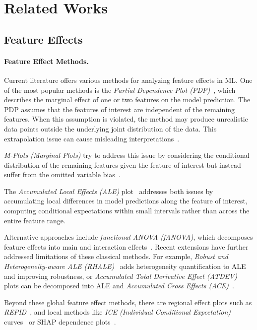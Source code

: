 \documentclass[runningheads]{llncs}
\begin{document}
\section{Related Works}\label{sec:related-works}

\subsection{Feature Effects}

\paragraph{Feature Effect Methods.}
Current literature offers various methods for analyzing feature effects in ML. %
One of the most popular methods is the \textit{Partial Dependence Plot
    (PDP)}~\cite{friedman_greedy_2001}, which describes the marginal effect of one
or two features on the model prediction. The PDP assumes that the features of
interest are independent of the remaining features. When this assumption is
violated, the method may produce unrealistic data points outside the underlying
joint distribution of the data. This extrapolation issue can cause misleading
interpretations~\cite{molnar_interpretable_2022,molnar_general_2022}.

\textit{M-Plots (Marginal Plots)} try to address this issue by considering the
conditional distribution of the remaining features given the feature of interest
but instead suffer from the omitted variable
bias~\cite{apley_visualizing_2020,friedman_greedy_2001}.

The \textit{Accumulated Local Effects (ALE)} plot~\cite{apley_visualizing_2020}
addresses both issues by accumulating local differences in model predictions
along the feature of interest, computing conditional expectations within small
intervals rather than across the entire feature range.

Alternative approaches include \textit{functional ANOVA (fANOVA)}, which
decomposes feature effects into main and interaction
effects~\cite{hooker_discovering_2004}. Recent extensions have further
addressed limitations of these classical methods. For example, \textit{Robust
    and Heterogeneity-aware ALE (RHALE)}~\cite{gkolemis_rhale_2023} adds
heterogeneity quantification to ALE and improving robustness, or
\textit{Accumulated Total Derivative Effect (ATDEV)} plots can be decomposed
into ALE and \textit{Accumulated Cross Effects (ACE)}~\cite{liu_model_2018}.

Beyond these global feature effect methods, there are regional effect plots
such as \textit{REPID}~\cite{herbinger_repid_2022}, and local methods like
\textit{ICE (Individual Conditional Expectation)}
curves~\cite{goldstein_peeking_2015} or SHAP dependence
plots~\cite{lundberg_local_2020}.
\end{document}
